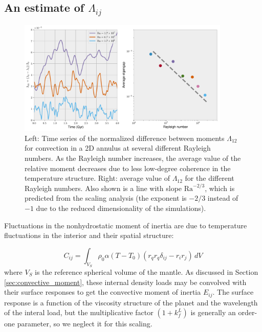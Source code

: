 \documentclass[extra,mreferee]{gji}
\begin{document}
\subsection{An estimate of $\Lambda_{ij}$}
\label{sec:lambda}

\begin{figure}
\centering
\includegraphics[width=0.9\textwidth]{figures/eigengap.pdf}
\caption{ Left: Time series of the normalized difference between moments $\Lambda_{12}$ for convection in a 2D annulus at several different Rayleigh numbers.  As the Rayleigh number increases, the average value of the relative moment decreases due to less low-degree coherence in the temperature structure.  Right:  average value of $\Lambda_{12}$ for the different Rayleigh numbers.  Also shown is a line with slope $\mathrm{Ra}^{-2/3}$, which is predicted from the scaling analysis (the exponent is $-2/3$ instead of $-1$ due to the reduced dimensionality of the simulations).}
\label{fig:eigengap}
\end{figure}


Fluctuations in the nonhydrostatic moment of inertia are due to temperature fluctuations in the interior and their spatial structure:

\begin{equation}
C_{ij} = \int_{V_S} \rho_0 \alpha (T-T_0) \left( r_q r_q \delta_{ij} - r_i r_j \right) \,dV
\label{eq:temperature_fluctuations}
\end{equation}
where $V_S$ is the reference spherical volume of the mantle.
As discussed in Section \ref{sec:convective_moment}, these internal density loads may be convolved with their surface responses to get the convective moment of inertia $E_{ij}$.
The surface response is a function of the viscosity structure of the planet and the wavelength of the interal load, but the multiplicative factor $(1+k^L_f)$ is generally an order-one parameter, so we neglect it for this scaling.
\end{document}
